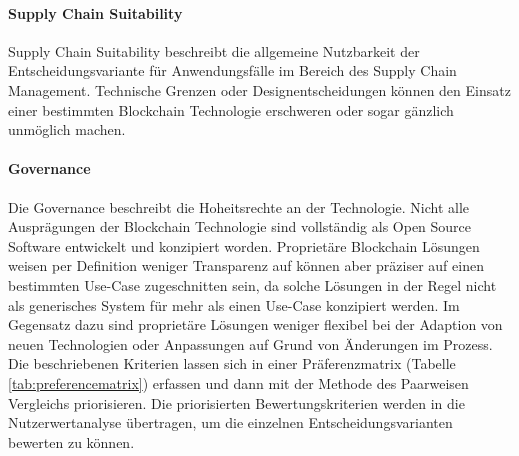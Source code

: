 \paragraph{Supply Chain Suitability}
Supply Chain Suitability beschreibt die allgemeine Nutzbarkeit der Entscheidungsvariante für Anwendungsfälle im Bereich des Supply Chain Management. Technische Grenzen oder Designentscheidungen können den Einsatz einer bestimmten Blockchain Technologie erschweren oder sogar gänzlich unmöglich machen.

\paragraph{Governance}
Die Governance beschreibt die Hoheitsrechte an der Technologie. Nicht alle Ausprägungen der Blockchain Technologie sind vollständig als Open Source Software entwickelt und konzipiert worden. Proprietäre Blockchain Lösungen weisen per Definition weniger Transparenz auf können aber präziser auf einen bestimmten Use-Case zugeschnitten sein, da solche Lösungen in der Regel nicht als generisches System für mehr als einen Use-Case konzipiert werden. Im Gegensatz dazu sind proprietäre Lösungen weniger flexibel bei der Adaption von neuen Technologien oder Anpassungen auf Grund von Änderungen im Prozess.\\

Die beschriebenen Kriterien lassen sich in einer Präferenzmatrix (Tabelle \ref{tab:preferencematrix}) erfassen und dann mit der Methode des Paarweisen Vergleichs priorisieren. Die priorisierten Bewertungskriterien werden in die Nutzerwertanalyse übertragen, um die einzelnen Entscheidungsvarianten bewerten zu können.

